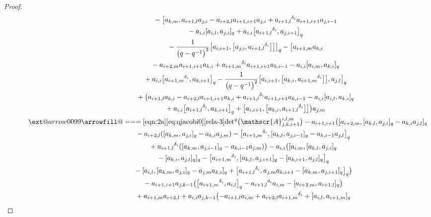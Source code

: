 \documentclass[10pt,a4paper]{amsart}
\makeatletter
\def\x@arrow{\DOTSB\Relbar}
\def\xlongequalsignfill@{\arrowfill@\x@arrow\Relbar\x@arrow}
\providecommand{\xlongequal}[2][]{%
	\ext@arrow 0099\xlongequalsignfill@{#1}{#2}}
\numberwithin{equation}{section}
\def\d{\delta}
\def\A{\mathscr{A}}
\makeatother
\begin{document}
\begin{proof}
\begin{gather*}
 \quad\qquad\qquad\qquad\quad {}- \bigl[a_{k,m},a_{i+1,l}a_{j,i} -a_{i+2,l}a_{i+1,i+1}a_{j,i}+{a_{i+1,l}}^{\d_i} a_{i+1,i+1}a_{j,i-1}\\
 \quad\qquad\qquad\qquad\quad {}-a_{i,i} [a_{i,l},a_{j,i} ]_q +a_{i,i} \bigl[{a_{i+1,l}}^{\d_i} ,a_{j,i+1} \bigr]_q\\
 \quad\qquad\qquad\qquad\quad {}-\frac{1}{\bigl(q-q^{-1}\bigr)^2} \bigl[a_{i,i+1}, \bigl[a_{j,i}, {a_{i+1,l}}^{\d_i} \bigr] \bigr] \bigr]_q - \bigl[a_{i+1,m}a_{k,i} \\
 \quad\qquad\qquad\qquad\quad {}-a_{i+2,m}a_{i+1,i+1}a_{k,i} +{a_{i+1,m}}^{\d_i} a_{i+1,i+1}a_{k,i-1} -a_{i,i} [a_{i,m},a_{k,i} ]_q \\
\quad\qquad\qquad \qquad \quad {}+a_{i,i} \bigl[{a_{i+1,m}}^{\d_i} ,a_{k,i+1} \bigr]_q-\frac{1}{\bigl(q-q^{-1}\bigr)^2} \bigl[a_{i,i+1}, \bigl[a_{k,i}, {a_{i+1,m}}^{\d_i} \bigr] \bigr],a_{j,l} \bigr]_q \\
\quad\qquad\qquad \qquad \quad{}+ \bigl(a_{i+1,l}a_{k,i} -a_{i+2,l}a_{i+1,i+1}a_{k,i}+{a_{i+1,l}}^{\d_i} a_{i+1,i+1}a_{k,i-1} -a_{i,i} [a_{i,l},a_{k,i} ]_q \\
\quad\qquad\qquad\qquad \quad {}+a_{i,i} \bigl[{a_{i+1,l}}^{\d_i} ,a_{k,i+1} \bigr]_q + \bigl[a_{i,i+1}, \bigl[a_{k,i},{a_{i+1,l}}^{\d_i} \bigr] \bigr] \bigr)a_{j,m}\\
\quad\qquad \xlongequal[\eqref{eqn:2a}\eqref{eq:qjacobi0}]{\eqref{rela-3}} {\det}^q\bigl(\A_{j,k,i+1}^{i,l,m}\bigr)-a_{i+1,i+1} \bigl( [a_{i+2,m}, [a_{k,l}, a_{j,i} ]_q-a_{k,i}a_{j,l} ]_q\\
 \quad\qquad\qquad\qquad\ {}-a_{i+2,l} ( [a_{k,m},a_{j,i} ]_q -a_{k,i}a_{j,m} ) - \bigl[{a_{i+1,m}}^{\d_i}, [a_{k,l}, a_{j,i-1} ]_q -a_{k,i-1}a_{j,l} \bigr]_q \\
 \quad\qquad\qquad\qquad\ {}+{a_{i+1,l}}^{\d_i} ( [a_{k,m},a_{j,i-1} ]_q -a_{k,i-1}a_{j,m} ) \bigr) -a_{i,i} \bigl( [a_{i,m}, [a_{k,l},a_{j,i} ]_q\\
\quad\qquad\qquad\qquad\ {}- [a_{k,i}, a_{j,l} ]_q ]_q - \bigl[{a_{i+1,m}}^{\d_i}, [a_{k,l},a_{j,i+1} ]_q - [a_{k,i+1},a_{j,l} ]_q \bigr]_q\\
 \quad\qquad\qquad\qquad\ {}- [a_{i,l}, [a_{k,m},a_{j,i} ]_q -a_{j,m}a_{k,i} ]_q+ \bigl[{a_{i+1,l}}^{\d_i},a_{j,m}a_{k,i+1} - [a_{k,m},a_{j,i+1} ]_q \bigr]_q \bigr)\\
\quad\qquad\qquad\qquad\ {}-a_{i+1,i+1}a_{j,k-1} \bigl( \bigl[{a_{i+1,m}}^{\d_i},a_{i,l} \bigr]_q -{a_{i+1,l}}^{\d_i}a_{i,m} - [a_{i+2,m},a_{i+1,l} ]_q \bigr)\\
\quad\qquad\qquad\qquad\ {}+a_{i+1,m}a_{i+2,l} +a_{i,i}a_{j,k-1} \bigl(-a_{i+1,l}a_{i,m} +a_{i+2,l}{a_{i+1,m}}^{\d_i} + [a_{i,l},a_{i+1,m} ]_q \\

\end{gather*}
\end{proof}
\end{document}
